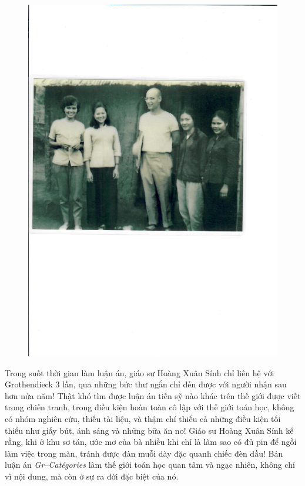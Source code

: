 \begin{multicols}{2}
\begin{figure}[H]
		\includegraphics[width= 1\linewidth]{Anh3}
		\vspace*{-10pt}
	\end{figure}
	Trong suốt thời gian làm luận án, giáo sư Hoàng Xuân Sính chỉ liên hệ với Grothendieck $3$ lần, qua những bức thư ngắn chỉ đến được với người nhận sau hơn nửa năm! Thật khó tìm được luận án tiến sỹ nào khác trên thế giới được viết trong chiến tranh, trong điều kiện hoàn toàn cô lập với thế giới toán học, không có nhóm nghiên cứu, thiếu tài liệu, và thậm chí thiếu cả những điều kiện tối thiểu như giấy bút, ánh sáng và những bữa ăn no! Giáo sư Hoàng Xuân Sính kể rằng, khi ở khu sơ tán, ước mơ của bà nhiều khi chỉ là làm sao có đủ pin để ngồi làm việc trong màn, tránh được đàn muỗi dày đặc quanh chiếc đèn dầu!
	\vskip 0.1cm
	Bản luận án \textit{Gr--Catégories} làm thế giới toán học quan tâm và ngạc nhiên, không chỉ vì nội dung, mà còn ở sự ra đời đặc biệt của nó. 

\end{multicols}
